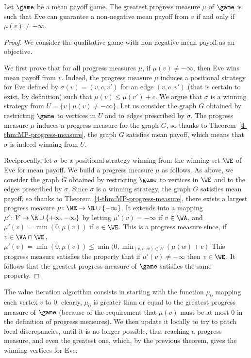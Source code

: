 \begin{theorem}\label{4-thm:greatest-progress-measure}
  Let $\game$ be a mean payoff game. The greatest progress measure $\mu$
  of $\game$ is such that Eve can guarantee a non-negative mean payoff
  from $v$ if and only if $\mu(v)\neq -\infty$.
\end{theorem}
\begin{proof}
  We consider the qualitative game with non-negative mean payoff as an
  objective.

  We first prove that for all progress measures $\mu$, if
  $\mu(v)\neq -\infty$, then Eve wins mean payoff from $v$. Indeed,
  the progress measure $\mu$ induces a positional strategy for Eve
  defined by $\sigma(v)=(v,c,v')$ for an edge $(v,c,v')$ (that is
  certain to exist, by definition) such that $\mu(v)\leq
  \mu(v')+c$. We argue that $\sigma$ is a winning strategy from
  $U=\{v\mid \mu(v)\neq -\infty\}$. Let us consider the graph $G$
  obtained by restricting $\game$ to vertices in $U$ and to edges
  prescribed by $\sigma$. The progress measure $\mu$ induces a
  progress measure for the graph $G$, so thanks to
  Theorem~\ref{4-thm:MP-progress-measure}, the graph $G$ satisfies
  mean payoff, which means that $\sigma$ is indeed winning from $U$.

  Reciprocally, let $\sigma$ be a positional strategy winning from the
  winning set $\WE$ of Eve for mean payoff. We build a progress
  measure $\mu$ as follows. As above, we consider the graph $G$
  obtained by restricting $\game$ to vertices in $\WE$ and to the
  edges prescribed by $\sigma$. Since $\sigma$ is a winning strategy,
  the graph $G$ satisfies mean payoff, so thanks to
  Theorem~\ref{4-thm:MP-progress-measure}, there exists a largest
  progress measure $\mu\colon \WE\to \R\cup\{+\infty\}$. It extends
  into a mapping $\mu'\colon V\to \R\cup\{+\infty,-\infty\}$ by
  letting $\mu'(v)=-\infty$ if $v\in\WA$, and $\mu'(v)=\min(0,\mu(v))$
  if $v\in \WE$. This is a progress measure since, if
  $v\in \VA\cap\WE$,
  $\mu'(v)=\min(0,\mu(v))\leq \min(0,\min_{(v,c,w)\in
    E}(\mu(w)+c)$  This progress
  measure satisfies the property that if $\mu'(v)\neq -\infty$ then
  $v\in \WE$. It follows that the greatest progress measure of $\game$
  satisfies the same property.
\end{proof}

The value iteration algorithm consists in starting with the function
$\mu_0$ mapping each vertex $v$ to $0$: clearly, $\mu_0$ is greater
than or equal to the greatest progress measure of $\game$ (because of
the requirement that $\mu(v)$ must be at most $0$ in the definition of
progress measures). We then update it locally to try to patch local
discrepancies, until it is no longer possible, thus reaching a
progress measure, and even the greatest one, which, by the previous
theorem, gives the winning vertices for Eve.

